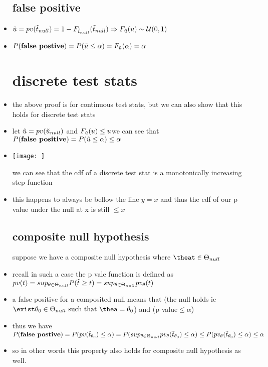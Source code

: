\documentclass{article}
\begin{document}
\begin{itemize}
\subsection{false positive}
\item $\Tilde{u}=pv(\Tilde{t}_{null})=1-F_{\Tilde{t}_{null}}(\Tilde{t}_{null})\Rightarrow F_{\Tilde{u}}(u)\sim \mathcal{U}(0,1)$
\item $P(\textbf{false postive})=P(\Tilde{u}\leq \alpha)=F_{\Tilde{u}}(\alpha)=\alpha$
\section{discrete test stats}
\item the above proof is for continuous test stats, but we can also show that this holds for discrete test stats 
\item let $\Tilde{u}=pv(\Tilde{u}_{null})$ and $F_{\Tilde{u}}(u)\leq u $we can see that $P(\textbf{false positive})=P(\Tilde{u}\leq \alpha)\leq \alpha$
\item \texttt{[image: ]}

\itme we can see that the cdf of a discrete test stat is a monotonically increasing step function 
\item this happens to always be bellow the line $y=x$ and thus the cdf of our p value under the null at x  is still $\leq x$
\subsection{composite null hypothesis }
\itme suppose we have a composite null hypothesis where $\theat\in \Theta_{null}$
\item recall in such a  case the p vale function is defined as $pv(t)=sup_{\theta\in \Theta_{null}}P(\Tilde{t}_{\null}\geq t)=sup_{\theta\in \Theta_{null}}pv_{\theta}(t)$
\item a false positive for a composited null means that (the null holds ie $\exist \theta_{0}\in \Theta_{null} \text{ such that }\thea=\theta_{0} $) and (p-value$\leq \alpha$)
\item thus we have $P(\textbf{false postive})=P(pv(\Tilde{t}_{\theta_{0}})\leq \alpha)=\\P(sup_{\theta\in \Theta_{null}} pv_{\theta}(\Tilde{t}_{\theta_{0}})\leq \alpha)\leq P( pv_{\theta}(\Tilde{t}_{\theta_{0}})\leq \alpha)\leq \alpha$
\item so in other words this property also holds for composite null hypothesis as well. 
\end{itemize}
\end{document}
